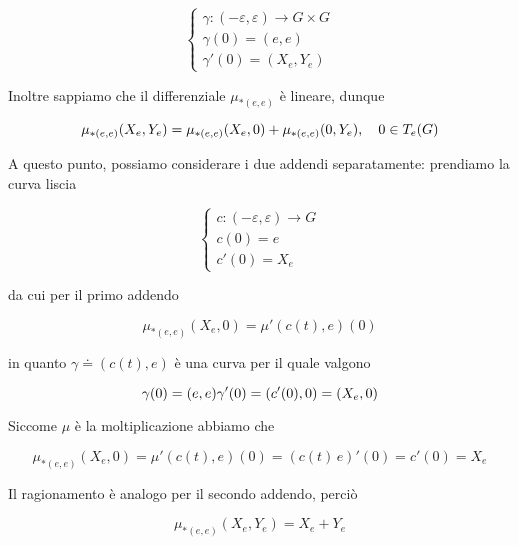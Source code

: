 \begin{equation}
	\begin{cases}
		\gamma : (-\varepsilon,\varepsilon) \to G \times G \\
		\gamma(0) = (e,e) \\
		\gamma'(0) = (X_{e},Y_{e})
	\end{cases}
\end{equation}

Inoltre sappiamo che il differenziale $ \mu_{*(e,e)} $ è lineare, dunque

\begin{equation}
	\mu_{*(e,e)}(X_{e},Y_{e}) = \mu_{*(e,e)}(X_{e},0) + \mu_{*(e,e)}(0,Y_{e}) \qcomma 0 \in T_{e}(G)
\end{equation}

A questo punto, possiamo considerare i due addendi separatamente: prendiamo la curva liscia

\begin{equation}
	\begin{cases}
		c : (-\varepsilon,\varepsilon) \to G \\
		c(0) = e \\
		c'(0) = X_{e}
	\end{cases}
\end{equation}

da cui per il primo addendo

\begin{equation}
	\mu_{*(e,e)}(X_{e},0) = \mu'(c(t),e)(0)
\end{equation}

in quanto $ \gamma \doteq (c(t),e) $ è una curva per il quale valgono

\begin{equation}
	\gamma(0) = (e,e) \\
	\gamma'(0) = (c'(0),0) = (X_{e},0)
\end{equation}

Siccome  $ \mu $ è la moltiplicazione abbiamo che

\begin{equation}
	\mu_{*(e,e)}(X_{e},0) = \mu'(c(t),e)(0) %
	= (c(t) \, e)'(0) %
	= c'(0) %
	= X_{e}
\end{equation}

Il ragionamento è analogo per il secondo addendo, perciò

\begin{equation}
	\mu_{*(e,e)}(X_{e},Y_{e}) = X_{e} + Y_{e}
\end{equation}

